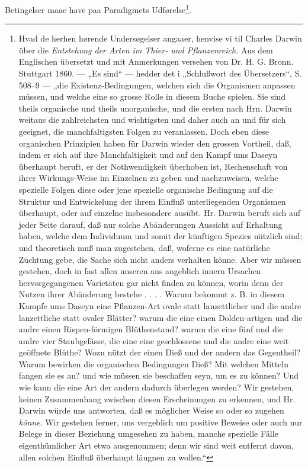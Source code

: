 \documentclass[11pt]{book}
\begin{document}
Betingelser maae have paa Paradigmets Udførelse\footnote{Hvad de
herhen hørende Undersøgelser angaaer, henvise vi til Charles Darwin
über die \emph{Entstehung der Arten im Thier- und Pflanzenreich.}
Aus dem Englischen übersetzt und mit Anmerkungen versehen von Dr.
H. G. Bronn. Stuttgart 1860. --- „Es sind“ --- hedder det i
„Schlußwort des Übersetzers“, S. 508--9 --- „die Existenz-Bedingungen,
welchen sich die Organismen anpassen müssen, und welche eine so
grosse Rolle in diesem Buche spielen. Sie sind theils organische und
theils unorganische, und die
ersten nach Hrn. Darwin weitaus die zahlreichsten und wichtigsten und
daher auch an und für sich geeignet, die manchfaltigsten Folgen zu
veranlassen. Doch eben diese organischen Prinzipien haben für Darwin
wieder den grossen Vortheil, daß, indem er sich auf ihre
Manchfaltigkeit und auf den Kampf ums Daseyn überhaupt beruft, er
der Nothwendigkeit überhoben ist, Rechenschaft von ihrer
Wirkungs-Weise im Einzelnen zu geben und nachzuweisen, welche
spezielle Folgen diese oder jene spezielle organische Bedingung auf die
Struktur und Entwickelung der ihrem Einfluß unterliegenden
Organismen überhaupt, oder auf einzelne insbesondere ausübt. Hr.
Darwin beruft sich auf jeder Seite darauf, daß nur solche
Abänderungen Aussicht auf Erhaltung haben, welche dem Individuum
und somit der künftigen Spezies nützlich sind; und theoretisch muß
man zugestehen, daß, woferne es eine natürliche Züchtung gebe, die
Sache sich nicht anders verhalten könne. Aber wir müssen gestehen,
doch in fast allen unseren aus angeblich innern Ursachen
hervorgegangenen Varietäten gar nicht finden zu können, worin denn
der Nutzen ihrer Abänderung bestehe . . . . Warum bekommt z. B. in
diesem Kampfe ums Daseyn eine Pflanzen-Art ovale statt lanzettlicher
und die andre lanzettliche statt ovaler Blätter? warum die eine einen
Dolden-artigen und die andre einen Rispen-förmigen Blüthenstand?
warum die eine fünf und die andre vier Staubgefässe, die eine eine
geschlossene und die andre eine weit geöffnete Blüthe? Wozu nützt
der einen Dieß und der andern das Gegentheil? Warum bewirken die
organischen Bedingungen Dieß? Mit welchen Mitteln fangen sie es an?
und wie müssen sie beschaffen seyn, um es zu können? Und wie kann
die eine Art der andern dadurch überlegen werden? Wir gestehen,
keinen Zusammenhang zwischen diesen Erscheinungen zu erkennen, und
Hr. Darwin würde uns antworten, daß es möglicher Weise so oder so
zugehen \emph{könne}. Wir gestehen ferner, uns vergeblich um
positive Beweise oder auch nur Belege in dieser Beziehung umgesehen
zu haben, manche spezielle Fälle eigenthümlicher Art etwa
ausgenommen; denn wir sind weit entfernt davon, allen solchen Einfluß
überhaupt läugnen zu wollen.“}.
\end{document}
